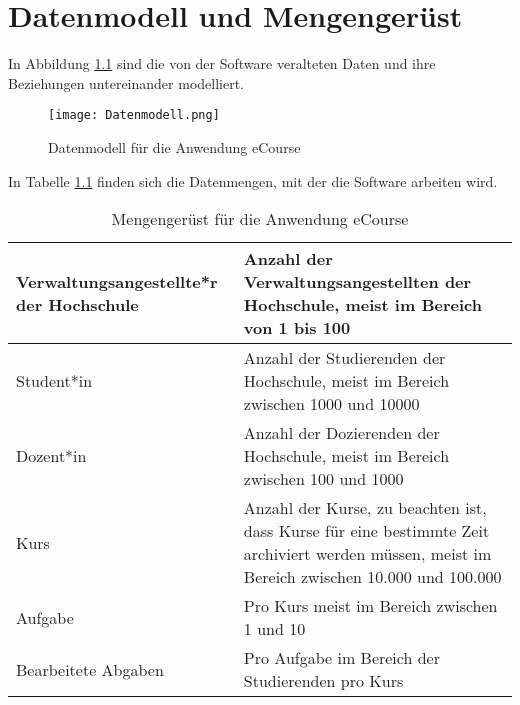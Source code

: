 
\chapter{Datenmodell und Mengengerüst}
In Abbildung \ref{fib:Datenmodell} sind die von der Software veralteten Daten und ihre Beziehungen untereinander modelliert.

\begin{figure}[h]
\centering
\texttt{[image: Datenmodell.png]}
\caption{Datenmodell für die Anwendung eCourse}
\label{fib:Datenmodell}
\end{figure}

In Tabelle \ref{tab:Mengengerüst} finden sich die Datenmengen, mit der die Software arbeiten wird.

\begin{table}
\centering
	\begin{tabularx}{\textwidth}[H]{|X|X|}
		\hline
		Verwaltungsangestellte*r der Hochschule & Anzahl der Verwaltungsangestellten der Hochschule, meist im Bereich von 1 bis 100  \\
		\hline 
		Student*in & Anzahl der Studierenden der Hochschule, meist im Bereich zwischen 1000 und 10000 \\
		\hline
		Dozent*in & Anzahl der Dozierenden der Hochschule, meist im Bereich zwischen 100 und 1000\\
		\hline
		Kurs & Anzahl der Kurse, zu beachten ist, dass Kurse für eine bestimmte Zeit archiviert werden müssen, meist im Bereich zwischen 10.000 und 100.000 \\
		\hline
		Aufgabe & Pro Kurs meist im Bereich zwischen 1 und 10 \\
		\hline
		Bearbeitete Abgaben & Pro Aufgabe im Bereich der Studierenden pro Kurs \\
		\hline
	\end{tabularx}
\caption{Mengengerüst für die Anwendung eCourse}
\label{tab:Mengengerüst}
\end{table}